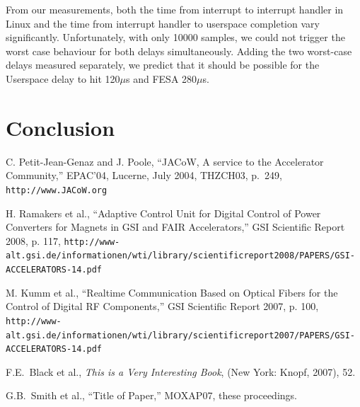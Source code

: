 \documentclass{JAC2003}
\begin{document}
From our measurements,
both the time from interrupt to interrupt handler in Linux 
and the time from interrupt handler to userspace completion vary significantly.
Unfortunately, with only 10000 samples, 
we could not trigger the worst case behaviour for both delays simultaneously.
Adding the two worst-case delays measured separately,
we predict that it should be possible for the Userspace delay to hit
120$\mu$s and FESA 280$\mu$s.

\section{Conclusion}

\begin{thebibliography}{9}   %

C. Petit-Jean-Genaz and J. Poole, ``JACoW, A service to the Accelerator Community,''
EPAC'04, Lucerne, July 2004, THZCH03,  p.~249, \texttt{http://www.JACoW.org}

H. Ramakers  et al., ``Adaptive Control Unit for Digital Control of Power Converters for Magnets in GSI and FAIR Accelerators,'' GSI Scientific Report 2008, p. 117,
\texttt{http://www-alt.gsi.de/informationen/wti/library/scientificreport2008/PAPERS/GSI-ACCELERATORS-14.pdf}

M. Kumm  et al., ``Realtime Communication Based on Optical Fibers for the Control of Digital RF Components,'' GSI Scientific Report 2007, p. 100,
\texttt{http://www-alt.gsi.de/informationen/wti/library/scientificreport2007/PAPERS/GSI-ACCELERATORS-14.pdf}



F.E.~Black et al., {\it This is a Very Interesting Book}, (New York: Knopf, 2007), 52.

G.B.~Smith et al., ``Title of Paper,'' MOXAP07, these proceedings.
\end{thebibliography}
\end{document}
